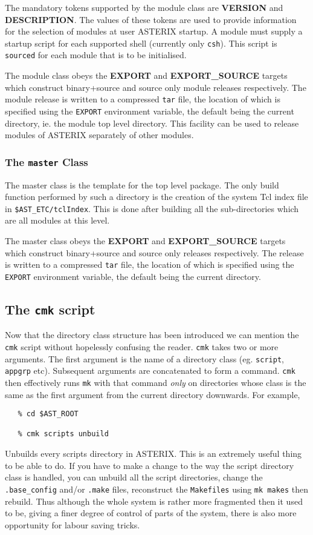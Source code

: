 The mandatory tokens supported by the module class are {\bf VERSION}
and {\bf DESCRIPTION}. The values of these tokens are used to 
provide information for the selection of modules at user ASTERIX startup.
A module must supply a startup script for each supported shell (currently 
only \verb+csh+). This script is \verb+sourced+ for each module that is
to be initialised.

The module class obeys the {\bf EXPORT} and {\bf EXPORT\_SOURCE} targets
which construct binary+source and source only module releases respectively. The
module release is written to a compressed \verb+tar+ file, the location of which
is specified using the \verb+EXPORT+ environment variable, the default
being the current directory, ie. the module top level directory. This 
facility can be used to release modules of ASTERIX separately of other
modules.

\subsubsection{The {\tt master} Class}

The master class is the template for the top level package. The only
build function performed by such a directory is the creation of the
system Tcl index file in \verb+$AST_ETC/tclIndex+. This is done after
building all the sub-directories which are all modules at this level.

The master class obeys the {\bf EXPORT} and {\bf EXPORT\_SOURCE} targets
which construct binary+source and source only releases respectively. The
release is written to a compressed \verb+tar+ file, the location of which
is specified using the \verb+EXPORT+ environment variable, the default
being the current directory.

\subsection{The {\tt cmk} script}

Now that the directory class structure has been introduced we can mention
the \verb+cmk+ script without hopelessly confusing the reader. \verb+cmk+
takes two or more arguments. The first argument is the name of a directory 
class (eg. \verb+script+, \verb+appgrp+ etc). Subsequent arguments are
concatenated to form a command. \verb+cmk+ then effectively runs \verb+mk+
with that command {\em only} on directories whose class is the same as
the first argument from the current directory downwards. For example,
\begin{verbatim}
   % cd $AST_ROOT
   
   % cmk scripts unbuild
\end{verbatim}
Unbuilds every scripts directory in ASTERIX. This is an extremely useful
thing to be able to do. If you have to make a change to the way the
script directory class is handled, you can unbuild all the script directories,
change the \verb+.base_config+ and/or \verb+.make+ files, reconstruct
the \verb+Makefiles+ using \verb+mk makes+ then rebuild.
Thus although the whole system is rather more fragmented then it used to
be, giving a finer degree of control of parts of the system, there is
also more opportunity for labour saving tricks.

